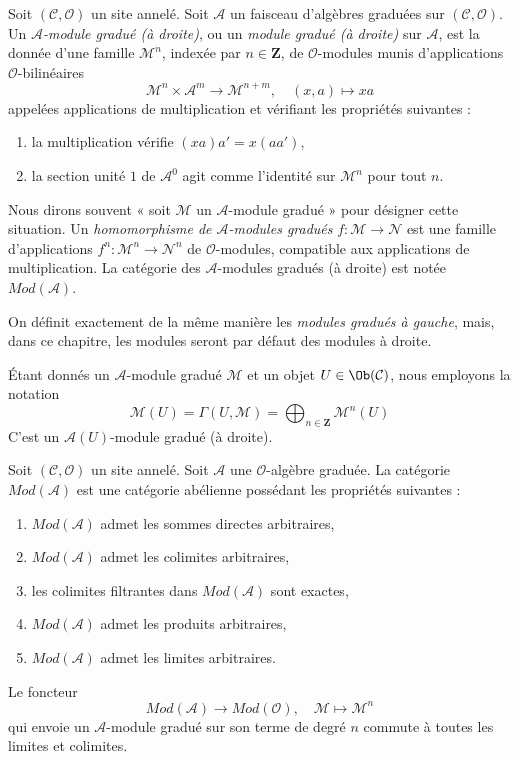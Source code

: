 \begin{definition}
\label{definition-gm}
Soit $(\mathcal{C}, \mathcal{O})$ un site annelé.
Soit $\mathcal{A}$ un faisceau d'algèbres graduées sur
$(\mathcal{C}, \mathcal{O})$.
Un {\it $\mathcal{A}$-module gradué (à droite)}, ou un
{\it module gradué (à droite)} sur $\mathcal{A}$, est la donnée d'une famille
$\mathcal{M}^n$, indexée par $n \in \mathbf{Z}$, de
$\mathcal{O}$-modules munis d'applications $\mathcal{O}$-bilinéaires
$$
\mathcal{M}^n \times \mathcal{A}^m \to \mathcal{M}^{n + m},\quad
(x, a) \longmapsto xa
$$
appelées applications de multiplication et vérifiant les propriétés suivantes :
\begin{enumerate}
\item la multiplication vérifie $(xa)a' = x(aa')$,
\item la section unité $1$ de $\mathcal{A}^0$ agit comme l'identité sur
$\mathcal{M}^n$ pour tout $n$.
\end{enumerate}
Nous dirons souvent « soit $\mathcal{M}$ un $\mathcal{A}$-module gradué »
pour désigner cette situation.
Un {\it homomorphisme de $\mathcal{A}$-modules gradués}
$f : \mathcal{M} \to \mathcal{N}$ est une famille d'applications
$f^n : \mathcal{M}^n \to \mathcal{N}^n$ de $\mathcal{O}$-modules,
compatible aux applications de multiplication.
La catégorie des $\mathcal{A}$-modules gradués (à droite) est notée
$\textit{Mod}(\mathcal{A})$.
\end{definition}

\noindent
On définit exactement de la même manière les {\it modules gradués à gauche},
mais, dans ce chapitre, les modules seront par défaut des modules à droite.

\medskip\noindent
Étant donnés un $\mathcal{A}$-module gradué $\mathcal{M}$ et un objet
$U \in \Ob(\mathcal{C})$, nous employons la notation
$$
\mathcal{M}(U) =
\Gamma(U, \mathcal{M}) =
\bigoplus\nolimits_{n \in \mathbf{Z}} \mathcal{M}^n(U)
$$
C'est un $\mathcal{A}(U)$-module gradué (à droite).

\begin{lemma}
\label{lemma-gm-abelian}
Soit $(\mathcal{C}, \mathcal{O})$ un site annelé.
Soit $\mathcal{A}$ une $\mathcal{O}$-algèbre graduée.
La catégorie $\textit{Mod}(\mathcal{A})$ est une catégorie abélienne
possédant les propriétés suivantes :
\begin{enumerate}
\item $\textit{Mod}(\mathcal{A})$ admet les sommes directes arbitraires,
\item $\textit{Mod}(\mathcal{A})$ admet les colimites arbitraires,
\item les colimites filtrantes dans $\textit{Mod}(\mathcal{A})$ sont exactes,
\item $\textit{Mod}(\mathcal{A})$ admet les produits arbitraires,
\item $\textit{Mod}(\mathcal{A})$ admet les limites arbitraires.
\end{enumerate}
Le foncteur
$$
\textit{Mod}(\mathcal{A}) \longrightarrow \textit{Mod}(\mathcal{O}),\quad
\mathcal{M} \longmapsto \mathcal{M}^n
$$
qui envoie un $\mathcal{A}$-module gradué sur son terme de degré $n$ commute
à toutes les limites et colimites.
\end{lemma}

